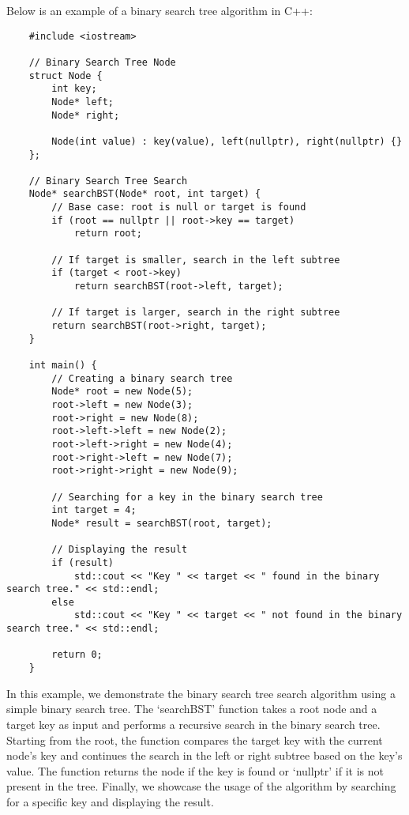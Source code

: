 \begin{solution}
    Below is an example of a binary search tree algorithm in C++:

    \horizontalline

    \begin{verbatim}
    #include <iostream>

    // Binary Search Tree Node
    struct Node {
        int key;
        Node* left;
        Node* right;
    
        Node(int value) : key(value), left(nullptr), right(nullptr) {}
    };
    
    // Binary Search Tree Search
    Node* searchBST(Node* root, int target) {
        // Base case: root is null or target is found
        if (root == nullptr || root->key == target)
            return root;
    
        // If target is smaller, search in the left subtree
        if (target < root->key)
            return searchBST(root->left, target);
        
        // If target is larger, search in the right subtree
        return searchBST(root->right, target);
    }
    
    int main() {
        // Creating a binary search tree
        Node* root = new Node(5);
        root->left = new Node(3);
        root->right = new Node(8);
        root->left->left = new Node(2);
        root->left->right = new Node(4);
        root->right->left = new Node(7);
        root->right->right = new Node(9);
    
        // Searching for a key in the binary search tree
        int target = 4;
        Node* result = searchBST(root, target);
    
        // Displaying the result
        if (result)
            std::cout << "Key " << target << " found in the binary search tree." << std::endl;
        else
            std::cout << "Key " << target << " not found in the binary search tree." << std::endl;
    
        return 0;
    }
    \end{verbatim}

    \horizontalline

    In this example, we demonstrate the binary search tree search algorithm using a simple binary search tree. The `searchBST' function takes a root node and a target key as input and performs a recursive search in the binary search tree. Starting from the root, the function compares the target key with the current node's key and 
    continues the search in the left or right subtree based on the key's value. The function returns the node if the key is found or `nullptr' if it is not present in the tree. Finally, we showcase the usage of the algorithm by searching for a specific key and displaying the result.
\end{solution}


